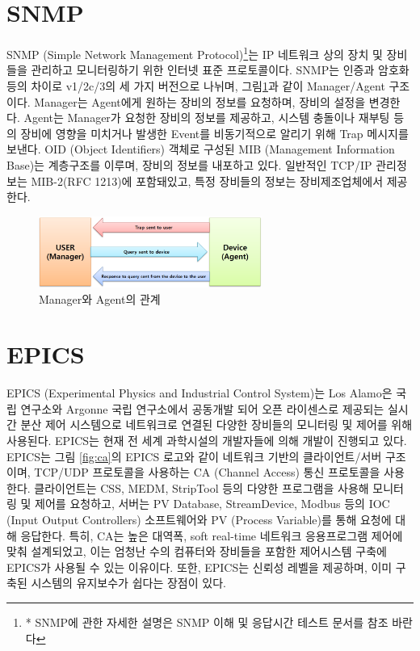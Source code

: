 \documentclass[11pt
  , a4paper
  , article
  , oneside
]{memoir}
\begin{document}
\section{SNMP}
SNMP (Simple Network Management Protocol)\footnote{* SNMP에 관한 자세한 설명은 SNMP 이해 및 응답시간 테스트 문서를 참조 바란다}는 IP 네트워크 상의 장치 및 장비들을 관리하고 모니터링하기 위한 인터넷 표준 프로토콜이다\citep{snmp}. SNMP는 인증과 암호화 등의 차이로 v1/2c/3의 세 가지 버전으로 나뉘며, 그림\ref{fig:relationship_m_a}과 같이 Manager/Agent 구조이다\citep{snmpm_a}. Manager는 Agent에게 원하는 장비의 정보를 요청하며, 장비의 설정을 변경한다. Agent는 Manager가 요청한 장비의 정보를 제공하고, 시스템 충돌이나 재부팅 등의 장비에 영향을 미치거나 발생한 Event를 비동기적으로 알리기 위해 Trap 메시지를 보낸다. OID (Object Identifiers) 객체로 구성된 MIB (Management Information Base)는 계층구조를 이루며, 장비의 정보를 내포하고 있다. 일반적인 TCP/IP 관리정보는 MIB-2(RFC 1213)에 포함돼있고, 특정 장비들의 정보는 장비제조업체에서 제공한다. 

\begin{figure}[h!]
  \centering
  \includegraphics[width=0.65\textwidth]{./images/relationship_m_a.eps}
  \caption{Manager와 Agent의 관계}
  \label{fig:relationship_m_a}   
\end{figure}

\hfill

\section{EPICS}
EPICS (Experimental Physics and Industrial Control System)는 Los Alamo은 국립 연구소와 Argonne 국립 연구소에서 공동개발 되어 오픈 라이센스로 제공되는 실시간 분산 제어 시스템으로 네트워크로 연결된 다양한 장비들의 모니터링 및 제어를 위해 사용된다. EPICS는 현재 전 세계 과학시설의 개발자들에 의해 개발이 진행되고 있다. EPICS는 그림 \ref{fig:ca}의 EPICS 로고와 같이 네트워크 기반의 클라이언트/서버 구조이며, TCP/UDP 프로토콜을 사용하는 CA (Channel Access) 통신 프로토콜을 사용한다. 클라이언트는 CSS, MEDM, StripTool 등의 다양한 프로그램을 사용해 모니터링 및 제어를 요청하고, 서버는 PV Database, StreamDevice, Modbus 등의 IOC (Input Output Controllers) 소프트웨어와 PV (Process Variable)를 통해 요청에 대해 응답한다. 특히, CA는 높은 대역폭, soft real-time 네트워크 응용프로그램 제어에 맞춰 설계되었고, 이는 엄청난 수의 컴퓨터와 장비들을 포함한 제어시스템 구축에 EPICS가 사용될 수 있는 이유이다. 또한, EPICS는 신뢰성 레벨을 제공하며, 이미 구축된 시스템의 유지보수가 쉽다는 장점이 있다\citep{epics}. 
\end{document}
